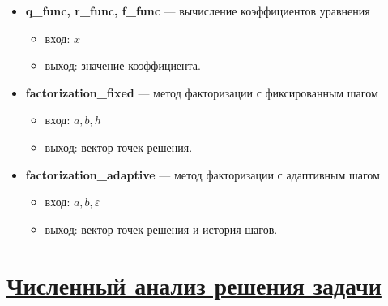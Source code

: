 \documentclass[14pt]{extarticle}
\begin{document}
	\begin{itemize}
		\item \textbf{q\_func, r\_func, f\_func} — вычисление коэффициентов уравнения
		\begin{itemize}
			\item вход: $x$
			\item выход: значение коэффициента.
		\end{itemize}
		
		\item \textbf{factorization\_fixed} — метод факторизации с фиксированным шагом
		\begin{itemize}
			\item вход: $a, b, h$
			\item выход: вектор точек решения.
		\end{itemize}
		
		\item \textbf{factorization\_adaptive} — метод факторизации с адаптивным шагом
		\begin{itemize}
			\item вход: $a, b, \varepsilon$
			\item выход: вектор точек решения и история шагов.
		\end{itemize}
	\end{itemize}
	
	
	\newpage
	\section{\Large \underline{Численный анализ решения задачи}}
	
\end{document}
